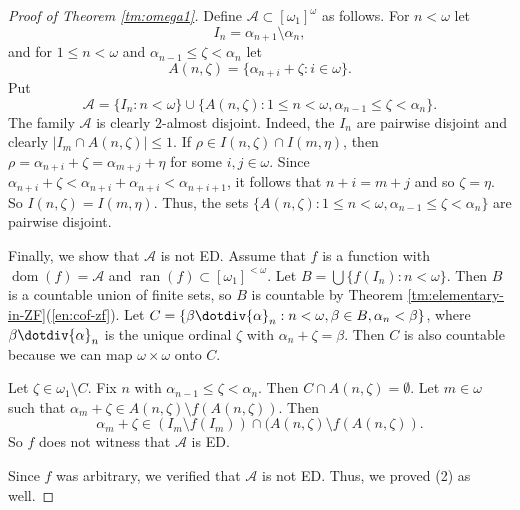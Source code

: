 \documentclass[a4paper,10pt,reqno]{amsart}
\numberwithin{equation}{section}
\theoremstyle{definition}
\theoremstyle{remark}
\newcommand{\mc}[1]{\mathcal{#1}}
\newcommand{\setm}{\setminus}
\newcommand{\empt}{\emptyset}
\newcommand{\subs}{\subset}
\newcommand{\dom}{\operatorname{dom}}
\newcommand{\ran}{\operatorname{ran}}
\begin{document}
\begin{proof}[Proof of Theorem \ref{tm:omega1}]
    Define $\mc A\subs {[{\omega}_1]}^{{\omega}}$ as follows. 
    For $n<{\omega}$ let 
    \begin{displaymath}
    I_n={\alpha}_{n+1}\setm {\alpha}_n,\end{displaymath}
    and for $1\le n <{\omega}$ and ${\alpha}_{n-1}\le {\zeta}<{\alpha}_n$ let
    \begin{displaymath}
    A(n,{\zeta})=\{{\alpha}_{n+i}+{\zeta}:i\in {\omega}\}.
    \end{displaymath}
    Put 
    \begin{displaymath}
    \mc A=\{I_n:n<{\omega}\}\cup\{A(n,{\zeta}):1\le n<{\omega},{\alpha}_{n-1}\le {\zeta}<{\alpha}_n\}.
    \end{displaymath}
    The family $\mc A$ is clearly $2$-almost disjoint.
    Indeed, the $I_n$ are pairwise disjoint and clearly  $|I_m\cap A(n,{\zeta})|\le 1$.
    If ${\rho}\in I(n,{\zeta})\cap I(m,{\eta})$, then 
    ${\rho}={\alpha}_{n+i}+{\zeta}={\alpha}_{m+j}+{\eta}$ for some $i,j\in {\omega}$.
    Since ${\alpha}_{n+i}+{\zeta}<{\alpha}_{n+i}+{\alpha}_{n+i}<{\alpha}_{n+i+1}$, it follows that 
    $n+i=m+j$ and so ${\zeta}={\eta}$. 
    So $I(n,{\zeta})= I(m,{\eta})$.
    Thus, the sets $\{A(n,{\zeta}):1\le n<{\omega},{\alpha}_{n-1}\le {\zeta}<{\alpha}_n\}$
    are pairwise disjoint.
    
    Finally, we show that $\mc A$ is not ED.
    Assume that $f$ is a function with $\dom(f)=\mc A$ and $\ran (f)\subs {[{\omega}_1]}^{<{\omega}}$.
    Let $B=\bigcup\{f(I_n):n<{\omega}\}$. Then $B$ is a countable union of finite sets, so $B$ is countable 
    by Theorem \ref{tm:elementary-in-ZF}(\ref{en:cof-zf}).
    Let $C=\{{\beta}\dotdiv{\alpha}_n:n<{\omega}, {\beta}\in B, {\alpha}_n<{\beta}\}$, where
    ${\beta}\dotdiv{\alpha}_n$ is the unique ordinal ${\zeta}$ with ${\alpha}_n+{\zeta}={\beta}$.
    Then $C$ is also countable because we can map ${\omega}\times {\omega}$ onto $C$. 
    
    Let ${\zeta}\in {\omega}_1\setm C$.  Fix $n$ with ${\alpha}_{n-1}\le {\zeta}<{\alpha}_n$.
    Then $C\cap A(n,{\zeta})=\empt$. Let $m\in {\omega}$ such that 
    ${\alpha}_m+{\zeta}\in A(n,{\zeta})\setm f(A(n,{\zeta}))$. Then 
    $${\alpha}_m+{\zeta}\in (I_m\setm f(I_m))\cap (A(n,{\zeta})\setm f(A(n,{\zeta})).$$
    So $f$ does not witness that $\mc A$ is ED.
    
    Since $f$ was arbitrary, we verified that $\mc A$ is not ED. Thus, we proved  (2) as well. 
    \end{proof}
    
\end{document}

